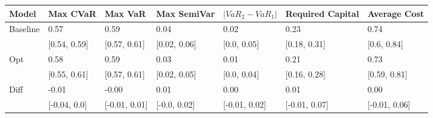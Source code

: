 \begin{tabular}{lllllll}
\toprule
   Model &     Max CVaR &       Max VaR &  Max SemiVar & $|VaR_2 - VaR_1|$ & Required Capital &  Average Cost \\
\midrule
Baseline &         0.57 &          0.59 &         0.04 &              0.02 &             0.23 &          0.74 \\
         & [0.54, 0.59] &  [0.57, 0.61] & [0.02, 0.06] &       [0.0, 0.05] &     [0.18, 0.31] &   [0.6, 0.84] \\
     Opt &         0.58 &          0.59 &         0.03 &              0.01 &             0.21 &          0.73 \\
         & [0.55, 0.61] &  [0.57, 0.61] & [0.02, 0.05] &       [0.0, 0.04] &     [0.16, 0.28] &  [0.59, 0.81] \\
    Diff &        -0.01 &         -0.00 &         0.01 &              0.00 &             0.01 &          0.00 \\
         & [-0.04, 0.0] & [-0.01, 0.01] & [-0.0, 0.02] &     [-0.01, 0.02] &    [-0.01, 0.07] & [-0.01, 0.06] \\
\bottomrule
\end{tabular}
